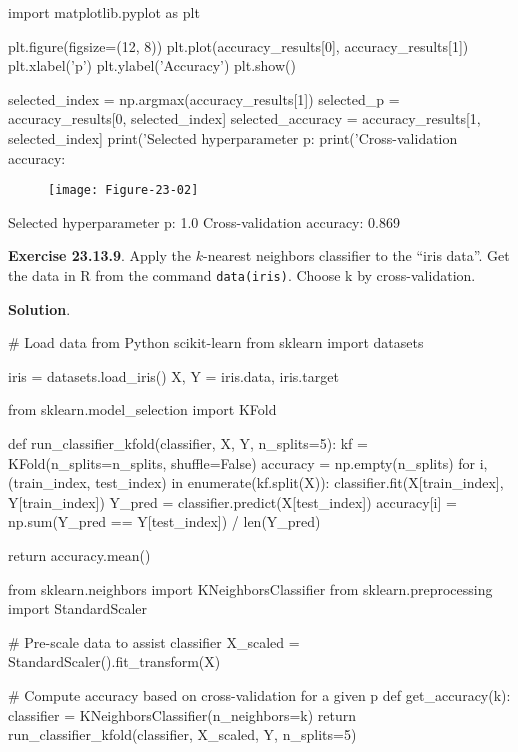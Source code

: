 \begin{python}
import matplotlib.pyplot as plt

plt.figure(figsize=(12, 8))
plt.plot(accuracy_results[0], accuracy_results[1])
plt.xlabel('p')
plt.ylabel('Accuracy')
plt.show()

selected_index = np.argmax(accuracy_results[1])
selected_p = accuracy_results[0, selected_index]
selected_accuracy = accuracy_results[1, selected_index]
print('Selected hyperparameter p: %
print('Cross-validation accuracy: %
\end{python}

\begin{figure}[H]
\texttt{[image: Figure-23-02]}
\end{figure}

\begin{console}
Selected hyperparameter p: 1.0
Cross-validation accuracy: 0.869
\end{console}

\textbf{Exercise 23.13.9}. Apply the \(k\)-nearest neighbors classifier
to the ``iris data''. Get the data in R from the command
\texttt{data(iris)}. Choose k by cross-validation.

\textbf{Solution}.

\begin{python}
# Load data from Python scikit-learn
from sklearn import datasets

iris = datasets.load_iris()
X, Y = iris.data, iris.target
\end{python}

\begin{python}
from sklearn.model_selection import KFold

def run_classifier_kfold(classifier, X, Y, n_splits=5):
    kf = KFold(n_splits=n_splits, shuffle=False)
    accuracy = np.empty(n_splits)
    for i, (train_index, test_index) in enumerate(kf.split(X)):
        classifier.fit(X[train_index], Y[train_index])
        Y_pred = classifier.predict(X[test_index])
        accuracy[i] = np.sum(Y_pred == Y[test_index]) / len(Y_pred)
    
    return accuracy.mean()
\end{python}

\begin{python}
from sklearn.neighbors import KNeighborsClassifier
from sklearn.preprocessing import StandardScaler

# Pre-scale data to assist classifier
X_scaled = StandardScaler().fit_transform(X)

# Compute accuracy based on cross-validation for a given p
def get_accuracy(k):
    classifier = KNeighborsClassifier(n_neighbors=k)
    return run_classifier_kfold(classifier, X_scaled, Y, n_splits=5)
\end{python}

